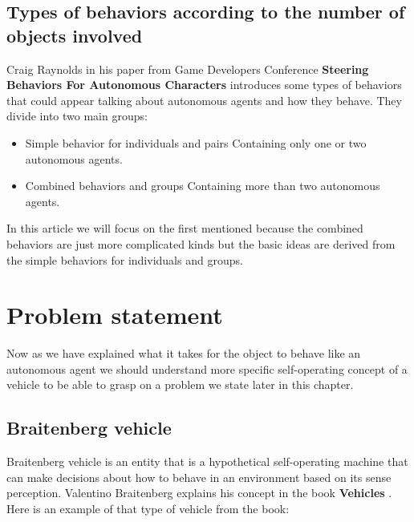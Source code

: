 \documentclass[10pt,twoside,english,a4paper]{article}
\begin{document}
\subsection{Types of behaviors according to the number of objects 
involved} \label{types of behaviors}

Craig Raynolds in his paper from Game Developers Conference 
\textbf{Steering Behaviors For Autonomous Characters} \cite{Raynolds} 
introduces some types of behaviors that could appear talking about 
autonomous agents and how they behave. They divide into two main 
groups:

\begin{itemize}

\item Simple behavior for individuals and pairs\newline
Containing only one or two autonomous agents.

\item Combined behaviors and groups\newline
Containing more than two autonomous agents.

\end{itemize}

In this article we will focus on the first mentioned because 
the combined behaviors are just more complicated kinds but 
the basic ideas are derived from the simple behaviors for 
individuals and groups. 


\section{Problem statement} \label{problem}

Now as we have explained what it takes for the object to behave like 
an autonomous agent we should understand more specific self-operating
concept of a vehicle to be able to grasp on a problem we state later 
in this chapter.

\subsection{Braitenberg vehicle} \label{braitenberg}

Braitenberg vehicle is an entity that is a hypothetical self-operating
machine that can make decisions about how to behave in an environment
based on its sense perception. Valentino Braitenberg explains his 
concept in the book \textbf{Vehicles} \cite{Braitenberg}. Here is 
an example of that type of vehicle from the book:
\end{document}
